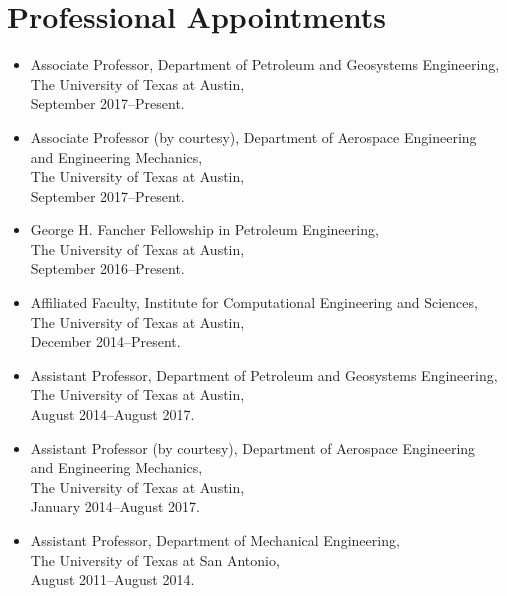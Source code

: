 \ifdefined\ispdf
\section*{Professional Appointments}

\begin{itemize}
    \item Associate Professor, Department of Petroleum and Geosystems Engineering, \\ 
          The University of Texas at Austin, \\
          September 2017--Present. 

    \item Associate Professor (by courtesy), Department of Aerospace Engineering \\ 
          and Engineering Mechanics, \\ 
          The University of Texas at Austin, \\
          September 2017--Present. 

    \item George H. Fancher Fellowship in Petroleum Engineering, \\ 
          The University of Texas at Austin, \\
          September 2016--Present. 

    \item Affiliated Faculty, Institute for Computational Engineering and Sciences, \\ 
          The University of Texas at Austin, \\
          December 2014--Present. 

    \item Assistant Professor, Department of Petroleum and Geosystems Engineering, \\ 
          The University of Texas at Austin, \\
          August 2014--August 2017. 

    \item Assistant Professor (by courtesy), Department of Aerospace Engineering \\ 
          and Engineering Mechanics, \\ 
          The University of Texas at Austin, \\
          January 2014--August 2017. 

    \item Assistant Professor, Department of Mechanical Engineering, \\ 
          The University of Texas at San Antonio,\\
          August 2011--August 2014. 


\end{itemize}
